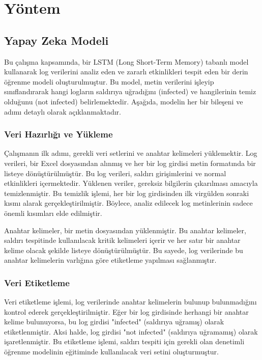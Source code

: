 \documentclass[12pt,a4paper]{article}
\begin{document}
\section{Yöntem}
\subsection{Yapay Zeka Modeli}

Bu çalışma kapsamında, bir LSTM (Long Short-Term Memory) tabanlı model kullanarak log verilerini analiz eden ve zararlı etkinlikleri tespit eden bir derin öğrenme modeli oluşturulmuştur. Bu model, metin verilerini işleyip sınıflandırarak hangi logların saldırıya uğradığını (infected) ve hangilerinin temiz olduğunu (not infected) belirlemektedir. Aşağıda, modelin her bir bileşeni ve adımı detaylı olarak açıklanmaktadır.

\subsubsection{Veri Hazırlığı ve Yükleme}

Çalışmanın ilk adımı, gerekli veri setlerini ve anahtar kelimeleri yüklemektir. Log verileri, bir Excel dosyasından alınmış ve her bir log girdisi metin formatında bir listeye dönüştürülmüştür. Bu log verileri, saldırı girişimlerini ve normal etkinlikleri içermektedir. Yüklenen veriler, gereksiz bilgilerin çıkarılması amacıyla temizlenmiştir. Bu temizlik işlemi, her bir log girdisinden ilk virgülden sonraki kısmı alarak gerçekleştirilmiştir. Böylece, analiz edilecek log metinlerinin sadece önemli kısımları elde edilmiştir.

Anahtar kelimeler, bir metin dosyasından yüklenmiştir. Bu anahtar kelimeler, saldırı tespitinde kullanılacak kritik kelimeleri içerir ve her satır bir anahtar kelime olacak şekilde listeye dönüştürülmüştür. Bu sayede, log verilerinde bu anahtar kelimelerin varlığına göre etiketleme yapılması sağlanmıştır.

\subsubsection{Veri Etiketleme}

Veri etiketleme işlemi, log verilerinde anahtar kelimelerin bulunup bulunmadığını kontrol ederek gerçekleştirilmiştir. Eğer bir log girdisinde herhangi bir anahtar kelime bulunuyorsa, bu log girdisi "infected" (saldırıya uğramış) olarak etiketlenmiştir. Aksi halde, log girdisi "not infected" (saldırıya uğramamış) olarak işaretlenmiştir. Bu etiketleme işlemi, saldırı tespiti için gerekli olan denetimli öğrenme modelinin eğitiminde kullanılacak veri setini oluşturmuştur.
\end{document}
